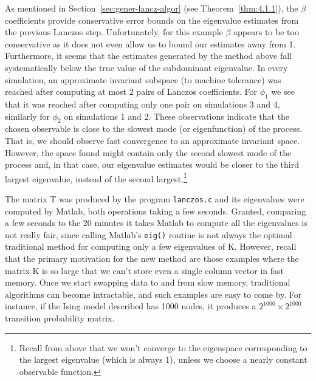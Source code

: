 \documentclass[12pt,letterpaper]{report}
\theoremstyle{plain}
\theoremstyle{definition}
\theoremstyle{remark}
\numberwithin{theorem}{chapter}
\numberwithin{claim}{chapter}
\numberwithin{equation}{chapter}
\numberwithin{conjecture}{chapter}
\newcommand\<{\ensuremath{\langle}}
\renewcommand\>{\ensuremath{\rangle}}
\begin{document}
As mentioned in Section~\ref{sec:gener-lancz-algor} (see
Theorem~\ref{thm:4.1.1}), the $\beta$ coefficients provide conservative error 
bounds on the eigenvalue estimates from the previous Lanczos
step. Unfortunately, for this example $\beta$ appears to be too conservative as
it does not even allow us to bound our estimates away from 1. Furthermore, it  
seems that the estimates generated by the method above fall systematically below
the true value of the subdominant eigenvalue. In every simulation, an
approximate invariant subspace (to machine tolerance) was reached after
computing at most 2 pairs of Lanczos coefficients. For $\phi_1$ we see that 
it was reached after computing only one pair on simulations 3 and 4, similarly
for $\phi_2$ on simulations 1 and 2. These observations indicate that the chosen
observable is close to the slowest mode (or 
eigenfunction) of the process. That is, we should observe fast convergence to an approximate
invariant space. However, the space found might contain only the second slowest mode of the
process and, in that case, our eigenvalue estimates would be closer to the third largest eigenvalue,
instead of the second largest.\footnote{Recall from above that we won't
converge to the eigenspace corresponding to the largest eigenvalue 
(which is always 1), unless we choose a nearly constant observable function.}

The matrix T was produced by the program {\tt lanczos.c} and its eigenvalues were computed
by Matlab, both operations taking a few seconds. Granted, comparing a few seconds to the 20
minutes it takes Matlab to compute all the eigenvalues is not really fair, 
since calling Matlab's {\tt eig()} routine is not always the
%
%
%
%
optimal traditional method for computing only a few eigenvalues of K. However, recall that
the primary motivation for the new method are those examples where the matrix K is so large
that we can't store even a single column vector in fast memory. Once we start
swapping data to and from slow memory, traditional algorithms can become
intractable, and such examples are easy to come by. For instance, if the Ising
model described has 1000 nodes, it produces a $2^{1000}\times 2^{1000}$
transition probability matrix.
%
%
%
%


\end{document}
